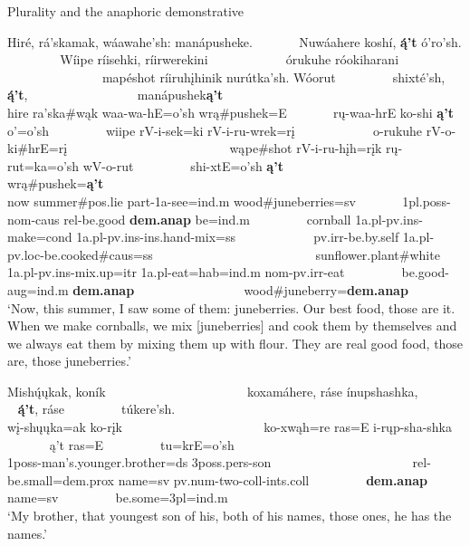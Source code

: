 \begin{exe}

\item\label{ExAnaphoricDemPl} Plurality and the anaphoric demonstrative

\begin{xlist}

\item\label{ExAnaphoricDemPl1} \glll Hiré, rá'skamak, wáawahe'sh: manápusheke. ~ ~ ~ ~ Nuwáahere koshí, \textbf{ą́'t} ó'ro'sh. ~ ~ ~ ~ ~  Wíipe ríisehki, ríirwerekini ~ ~ ~ ~ ~ ~ ~  órukuhe róokiharani ~ ~ ~ ~ ~ ~ ~ ~ ~ ~ ~ ~ ~ ~ ~ mapéshot ríiruhįhinik nurútka'sh.  Wóorut ~ ~ ~ ~ ~ shixté'sh, \textbf{ą́'t}, ~ ~ ~ ~ ~ ~ ~ ~ ~ ~ manápushek\textbf{ą't}\\
    hire ra'ska\#wąk waa-wa-hE=o'sh wrą\#pushek=E ~ ~ ~ ~ rų-waa-hrE ko-shi \textbf{ą't} o'=o'sh ~ ~ ~ ~ ~ wiipe rV-i-sek=ki rV-i-ru-wrek=rį ~ ~ ~ ~ ~  ~ ~  o-rukuhe rV-o-ki\#hrE=rį ~ ~ ~ ~ ~ ~ ~ ~ ~ ~ ~ ~ ~ ~ ~ wąpe\#shot rV-i-ru-hįh=rįk rų-rut=ka=o'sh wV-o-rut ~ ~ ~ ~ ~ shi-xtE=o'sh \textbf{ą't} ~ ~ ~ ~ ~ ~ ~ ~ ~ ~ wrą\#pushek=\textbf{ą't}\\
    \textnormal{now} \textnormal{summer}\#pos.lie part-1a-\textnormal{see}=ind.m \textnormal{wood}\#\textnormal{juneberries}=sv ~ ~ ~ ~ 1pl.poss-nom-caus rel-\textnormal{be.good} \textbf{dem.anap} \textnormal{be}=ind.m ~ ~ ~ ~ ~ \textnormal{cornball}  1a.pl-pv.ins-\textnormal{make}=cond 1a.pl-pv.ins-ins.hand-\textnormal{mix}=ss ~ ~ ~ ~ ~ ~ ~ pv.irr-\textnormal{be.by.self} 1a.pl-pv.loc-\textnormal{be.cooked}\#caus=ss ~ ~ ~ ~ ~ ~ ~ ~ ~ ~ ~ ~ ~ ~ ~ \textnormal{sunflower.plant}\#\textnormal{white} 1a.pl-pv.ins-\textnormal{mix.up}=itr 1a.pl-\textnormal{eat}=hab=ind.m nom-pv.irr-\textnormal{eat} ~ ~ ~ ~ ~  \textnormal{be.good}-aug=ind.m \textbf{dem.anap} ~ ~ ~ ~ ~ ~ ~ ~ ~ ~ \textnormal{wood}\#\textnormal{juneberry}=\textbf{dem.anap}\\
    \glt `Now, this summer, I saw some of them: juneberries. Our best food, those are it. When we make cornballs, we mix [juneberries] and cook them by themselves and we always eat them by mixing them up with flour. They are real good food, those are, those juneberries.' \citep[52]{hollow1973a}

\item\label{ExAnaphoricDemPl2} \glll Mishų́ųkak, koník ~ ~ ~ ~ ~ ~ ~ ~ ~ ~ ~ ~ ~ koxamáhere, ráse ínupshashka, ~ ~ ~ ~ ~  \textbf{ą́'t}, ráse ~ ~ ~ ~ ~ túkere'sh.\\
    wį-shųųka=ak ko-rįk ~ ~ ~ ~ ~ ~ ~ ~ ~  ~ ~ ~ ~   ko-xwąh=re ras=E i-rųp-sha-shka ~ ~ ~ ~ ~  ą't ras=E ~ ~ ~ ~ ~ tu=krE=o'sh\\
    1poss-\textnormal{man's.younger.brother}=ds 3poss.pers-\textnormal{son} ~ ~ ~ ~ ~ ~ ~ ~ ~ ~ ~ ~ ~  rel-\textnormal{be.small}=dem.prox \textnormal{name}=sv pv.num-\textnormal{two}-coll-ints.coll ~ ~ ~ ~ ~  \textbf{dem.anap} \textnormal{name}=sv ~ ~ ~  ~ ~ \textnormal{be.some}=3pl=ind.m\\
    \glt `My brother, that youngest son of his, both of his names, those ones, he has the names.' \citep[61]{hollow1973a}
    

\end{xlist}
\end{exe}
